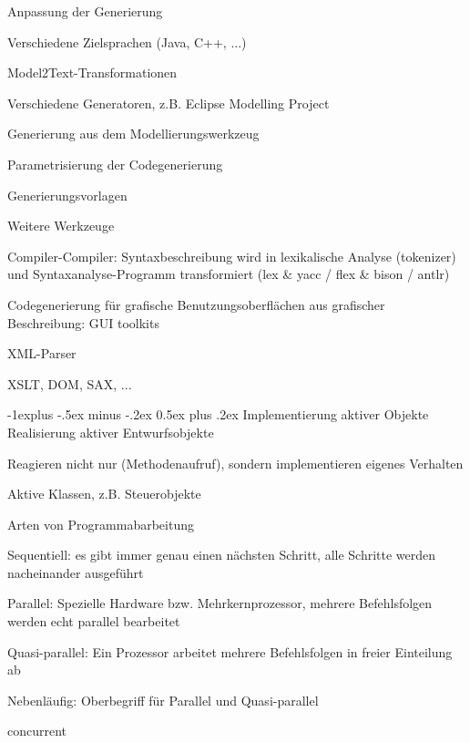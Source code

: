 \documentclass[a4paper]{article}
\makeatletter
\renewcommand{\subsection}{\@startsection{subsection}{2}{0mm}%
                                {-1explus -.5ex minus -.2ex}%
                                {0.5ex plus .2ex}%
                                {\normalfont\normalsize\bfseries}}
\makeatother
\begin{document}
\begin{multicols}{3}
  Anpassung der Generierung
  \begin{itemize*}
    \item Verschiedene Zielsprachen (Java, C++, ...)
    \item Model2Text-Transformationen
          \begin{itemize*}
            \item Verschiedene Generatoren, z.B. Eclipse Modelling Project
          \end{itemize*}
    \item Generierung aus dem Modellierungswerkzeug
          \begin{itemize*}
            \item Parametrisierung der Codegenerierung
            \item Generierungsvorlagen
          \end{itemize*}
  \end{itemize*}

  Weitere Werkzeuge
  \begin{itemize*}
    \item Compiler-Compiler: Syntaxbeschreibung wird in lexikalische Analyse (tokenizer) und Syntaxanalyse-Programm transformiert (lex \& yacc / flex \& bison / antlr)
    \item Codegenerierung für grafische Benutzungsoberflächen aus grafischer Beschreibung: GUI toolkits
    \item XML-Parser
          \begin{itemize*}
            \item XSLT, DOM, SAX, ...
          \end{itemize*}
  \end{itemize*}

  \subsection{Implementierung aktiver Objekte}
  Realisierung aktiver Entwurfsobjekte
  \begin{itemize*}
    \item Reagieren nicht nur (Methodenaufruf), sondern implementieren eigenes Verhalten
    \item Aktive Klassen, z.B. Steuerobjekte
  \end{itemize*}

  Arten von Programmabarbeitung
  \begin{itemize*}
    \item Sequentiell: es gibt immer genau einen nächsten Schritt, alle Schritte werden nacheinander ausgeführt
    \item Parallel: Spezielle Hardware bzw. Mehrkernprozessor, mehrere Befehlsfolgen werden echt parallel bearbeitet
    \item Quasi-parallel: Ein Prozessor arbeitet mehrere Befehlsfolgen in freier Einteilung ab
    \item Nebenläufig: Oberbegriff für Parallel und Quasi-parallel
          \begin{itemize*}
            \item concurrent
          \end{itemize*}
  \end{itemize*}


\end{multicols}
\end{document}
